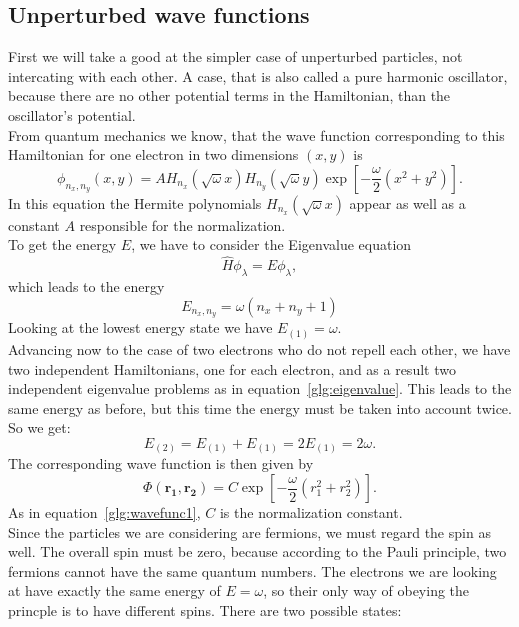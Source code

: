 \subsection{Unperturbed wave functions}\label{sec:unperturbed}
First we will take a good at the simpler case of unperturbed particles, not intercating with each other. A case, that is also called a pure harmonic oscillator, because there are no other potential terms in the Hamiltonian, than the oscillator's potential.\\
From quantum mechanics we know, that the wave function corresponding to this Hamiltonian for one electron in two dimensions $(x,y)$ is
\begin{equation}\label{glg:wavefunc1}
\phi_{n_x,n_y}(x,y) = A H_{n_x} (\sqrt{\omega} x) H_{n_y} (\sqrt{\omega} y) \exp\left[-\frac{\omega}{2} (x^2+y^2)\right].
\end{equation}
In this equation the Hermite polynomials $H_{n_x} (\sqrt{\omega} x)$ appear as well as a constant $A$ responsible for the normalization.\\
To get the energy $E$, we have to consider the Eigenvalue equation
\begin{equation}\label{glg:eigenvalue}
\hat{H} \phi_\lambda = E \phi_\lambda,
\end{equation}
which leads to the energy
\begin{equation}
E_{n_x,n_y} = \omega(n_x + n_y +1)
\end{equation}
Looking at the lowest energy state we have $E_{(1)}=\omega$.\\
Advancing now to the case of two electrons who do not repell each other, we have two independent Hamiltonians, one for each electron, and as a result two independent eigenvalue problems as in equation~\ref{glg:eigenvalue}. This leads to the same energy as before, but this time the energy must be taken into account twice. So we get:
\begin{equation}
E_{(2)} = E_{(1)} + E_{(1)} = 2 E_{(1)} = 2\omega.
\end{equation}
The corresponding wave function is then given by
\begin{equation}
\Phi(\mathbf{r_1},\mathbf{r_2}) = C \exp\left[-\frac{\omega}{2} (r_1^2+r_2^2)\right].
\end{equation}
As in equation~\ref{glg:wavefunc1}, $C$ is the normalization constant.\\
Since the particles we are considering are fermions, we must regard the spin as well. The overall spin must be zero, because according to the Pauli principle, two fermions cannot have the same quantum numbers. The electrons we are looking at have exactly the same energy of $E = \omega$, so their only way of obeying the princple is to have different spins. There are two possible states:
